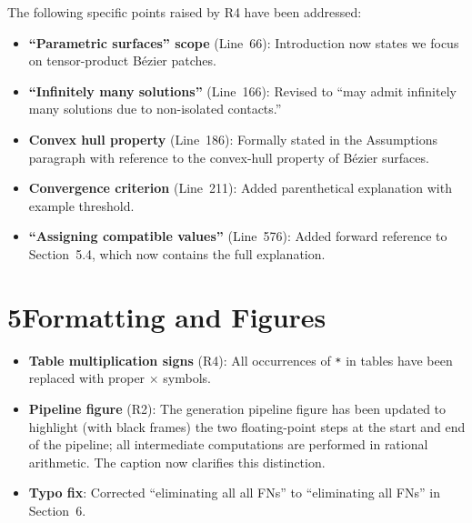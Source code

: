 \documentclass{article}
\begin{document}
\noindent The following specific points raised by R4 have been addressed:
\begin{itemize}[nosep]
    \item \textbf{``Parametric surfaces'' scope} (Line~66): Introduction now states we focus on tensor-product B\'{e}zier patches.
    \item \textbf{``Infinitely many solutions''} (Line~166): Revised to ``may admit infinitely many solutions due to non-isolated contacts.''
    \item \textbf{Convex hull property} (Line~186): Formally stated in the Assumptions paragraph with reference to the convex-hull property of B\'{e}zier surfaces.
    \item \textbf{Convergence criterion} (Line~211): Added parenthetical explanation with example threshold.
    \item \textbf{``Assigning compatible values''} (Line~576): Added forward reference to Section~5.4, which now contains the full explanation.
\end{itemize}

\section*{5\quad Formatting and Figures}

\begin{itemize}[nosep]
    \item \textbf{Table multiplication signs} (R4): All occurrences of \texttt{*} in tables have been replaced with proper $\times$ symbols.
    \item \textbf{Pipeline figure} (R2): The generation pipeline figure has been updated to highlight (with black frames) the two floating-point steps at the start and end of the pipeline; all intermediate computations are performed in
   rational arithmetic. The caption now clarifies this distinction.
    \item \textbf{Typo fix}: Corrected ``eliminating all all FNs'' to ``eliminating all FNs'' in Section~6.
\end{itemize}

\end{document}
